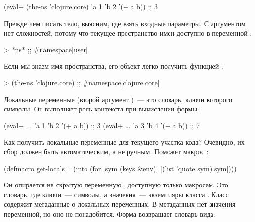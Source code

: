 \begin{english}
  \begin{clojure}
(eval+ (the-ns 'clojure.core) {'a 1 'b 2} '(+ a b))
;; 3
  \end{clojure}
\end{english}

Прежде чем писать тело, выясним, где взять входные параметры. С аргументом  нет сложностей, потому что текущее пространство имен доступно в переменной :

\begin{english}
  \begin{clojure}
> *ns*
;; #namespace[user]
  \end{clojure}
\end{english}

Если мы знаем имя пространства, его объект легко получить функцией :

\begin{english}
  \begin{clojure}
> (the-ns 'clojure.core)
;; #namespace[clojure.core]
  \end{clojure}
\end{english}

Локальные переменные (второй аргумент )~--- это словарь, ключи которого символы. Он выполняет роль контекста при вычислении формы:

\begin{english}
  \begin{clojure}
(eval+ ... {'a 1 'b 2} '(+ a b)) ;; 3
(eval+ ... {'a 3 'b 4} '(+ a b)) ;; 7
  \end{clojure}
\end{english}

Как получить локальные переменные для текущего участка кода? Очевидно, их сбор должен быть автоматическим, а не ручным. Поможет макрос :

\begin{english}
  \begin{clojure}
(defmacro get-locals []
  (into {} (for [sym (keys &env)]
             [(list 'quote sym) sym])))
  \end{clojure}
\end{english}

Он опирается на скрытую переменную , доступную только макросам. Это словарь, где ключи~--- символы, а значения~--- экземпляры класса . Класс  содержит метаданные о локальных переменных. В метаданных нет значения переменной, но оно не понадобится. Форма  возвращает словарь вида:


